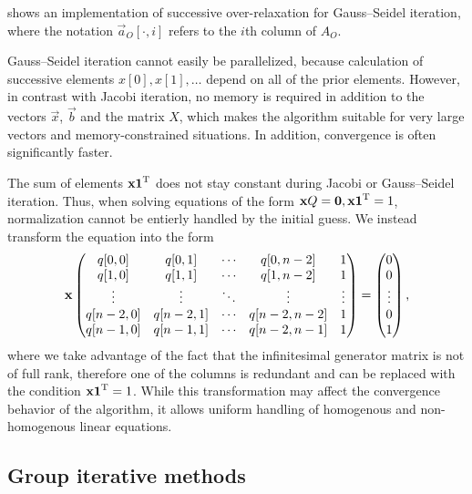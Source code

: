  shows an implementation of
successive over-relaxation for Gauss--Seidel iteration, where the
notation $\vec{a}_O[\cdot, i]$ refers to the $i$th column of $A_O$.

Gauss--Seidel iteration cannot easily be parallelized, because
calculation of successive elements $x[0], x[1], \ldots$ depend on all
of the prior elements. However, in contrast with Jacobi iteration, no
memory is required in addition to the vectors $\vec{x}$, $\vec{b}$ and
the matrix $X$, which makes the algorithm suitable for very large
vectors and memory-constrained situations. In addition, convergence is
often significantly faster.

The sum of elements $\bm{\mathrm{x}} \bm{\mathrm{1}}^{\mathrm{T}}$ does not stay constant during
Jacobi or Gauss--Seidel iteration. Thus, when solving equations of the
form $\bm{\mathrm{x}} Q = \bm{\mathrm{0}}, \bm{\mathrm{x}} \bm{\mathrm{1}}^{\mathrm{T}} = 1$, normalization
cannot be entierly handled by the initial guess. We instead transform
the equation into the form
\begin{equation}
  \label{eq:algorithms:iterative:normalized-linear-system}
  \vec{x} \begin{pmatrix}
    q[0,0] & q[0,1] & \cdots & q[0,n - 2] & 1 \\
    q[1,0] & q[1,1] & \cdots & q[1,n - 2] & 1 \\
    \vdots & \vdots & \ddots & \vdots & \vdots \\
    q[n - 2,0] & q[n - 2,1] & \cdots & q[n - 2,n - 2] & 1 \\
    q[n - 1,0] & q[n - 1,1] & \cdots & q[n - 2,n - 1] & 1 \\
  \end{pmatrix} = \begin{pmatrix}
    0 \\ 0 \\ \vdots \\ 0 \\ 1
  \end{pmatrix} \text,
\end{equation}
where we take advantage of the fact that the infinitesimal generator
matrix is not of full rank, therefore one of the columns is redundant
and can be replaced with the condition $\bm{\mathrm{x}} \bm{\mathrm{1}}^{\mathrm{T}} = 1$. While
this transformation may affect the convergence behavior of the
algorithm, it allows uniform handling of homogenous and non-homogenous
linear equations.

\subsection{Group iterative methods}
\label{sec:algorithms:group-jgs}


